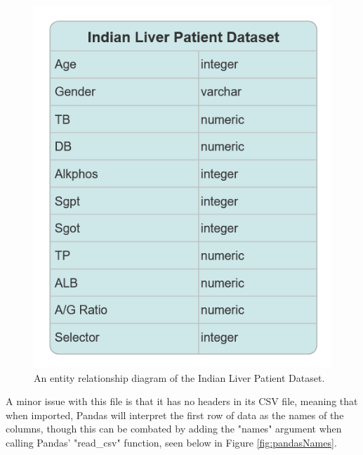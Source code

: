 \documentclass[12pt]{report}
\begin{document}
\begin{figure}[H]
    \centering
    \includegraphics[width=.75\linewidth]{ILPD-ERD.png}
    \caption{An entity relationship diagram of the Indian Liver Patient Dataset.}
    \label{fig:ILPD-ERD}
\end{figure}


A minor issue with this file is that it has no headers in its CSV file, meaning that when imported, Pandas will interpret the first 
row of data as the names of the columns, though this can be combated by adding the "names" argument when calling Pandas' "read\_csv" function,
seen below in Figure \ref{fig:pandasNames}. 
\end{document}

